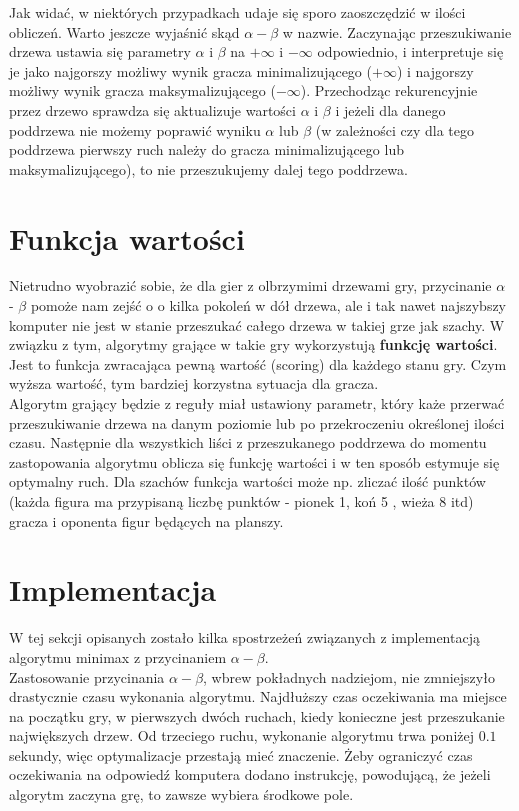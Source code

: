 \documentclass[licencjacka]{pracamgr}
\begin{document}
Jak widać, w niektórych przypadkach udaje się sporo zaoszczędzić w ilości obliczeń.  Warto jeszcze wyjaśnić skąd $\alpha - \beta$ w nazwie. Zaczynając przeszukiwanie drzewa ustawia się parametry $\alpha$ i $\beta$ na $+\infty$ i $-\infty$ odpowiednio, i interpretuje się je jako najgorszy możliwy wynik gracza minimalizującego ($+\infty$) i  najgorszy możliwy wynik gracza maksymalizującego ($-\infty$). Przechodząc rekurencyjnie przez drzewo sprawdza się aktualizuje wartości $\alpha$ i $\beta$ i jeżeli dla danego poddrzewa  nie możemy poprawić wyniku  $\alpha$ lub  $\beta$ (w zależności czy dla tego poddrzewa pierwszy ruch należy do gracza minimalizującego lub maksymalizującego), to nie przeszukujemy dalej tego poddrzewa.


\section{Funkcja wartości}
Nietrudno wyobrazić sobie, że dla gier z olbrzymimi drzewami gry, przycinanie $\alpha$ - $\beta$ pomoże nam zejść o o kilka pokoleń w dół drzewa, ale i tak nawet najszybszy komputer nie jest w stanie przeszukać całego drzewa w takiej grze jak szachy. W związku z tym,  algorytmy grające w takie gry wykorzystują \textbf{funkcję wartości}. Jest to funkcja zwracająca pewną wartość (scoring) dla każdego stanu gry. Czym wyższa wartość, tym bardziej korzystna sytuacja dla gracza. \\

Algorytm grający będzie z reguły miał ustawiony parametr, który każe przerwać przeszukiwanie drzewa na danym poziomie lub po przekroczeniu określonej ilości czasu. Następnie dla wszystkich liści z przeszukanego poddrzewa do momentu zastopowania algorytmu oblicza się funkcję wartości i w ten sposób estymuje się optymalny ruch.  Dla szachów funkcja wartości może np. zliczać ilość punktów (każda figura ma przypisaną liczbę punktów - pionek 1, koń 5 , wieża 8 itd)  gracza i oponenta figur będących na planszy. 


\section{Implementacja}
 W tej sekcji opisanych zostało  kilka spostrzeżeń związanych z implementacją algorytmu minimax z przycinaniem $\alpha - \beta$.\\

Zastosowanie przycinania $\alpha - \beta$, wbrew pokładnych nadziejom, nie zmniejszyło drastycznie  czasu wykonania algorytmu. Najdłuższy czas oczekiwania ma miejsce na początku gry, w pierwszych dwóch ruchach,  kiedy konieczne jest przeszukanie największych drzew. Od trzeciego ruchu, wykonanie algorytmu trwa poniżej $0.1$ sekundy, więc optymalizacje przestają mieć znaczenie.  Żeby ograniczyć czas oczekiwania na odpowiedź komputera dodano instrukcję, powodującą, że jeżeli algorytm zaczyna grę, to zawsze wybiera środkowe pole.\\
\end{document}

